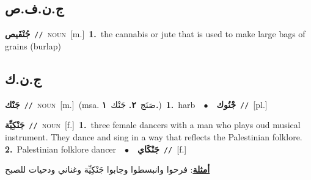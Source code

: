 \documentclass[10pt,a4paper,twoside]{article} %
\begin{document}
\begin{multicols}{2}
\vspace{-3mm}
\subsection*{\color{blue}\foreignlanguage{arabic}{ج.ن.ف.ص}\color{blue}{}} 

{\setlength\topsep{0pt}\textbf{\foreignlanguage{arabic}{جُنْفَيص}}\ {\color{gray}\texttt{//}\color{black}}\ \textsc{noun}\ [m.]\ \textbf{1.}~the cannabis or jute that is used to make large bags of grains (burlap)\ } \vspace{2mm}

\vspace{-3mm}
\subsection*{\color{blue}\foreignlanguage{arabic}{ج.ن.ك}\color{blue}{}} 

{\setlength\topsep{0pt}\textbf{\foreignlanguage{arabic}{جَنْك}}\ {\color{gray}\texttt{//}\color{black}}\ \textsc{noun}\ [m.]\ \color{gray}(msa. \foreignlanguage{arabic}{صَنَج}~\foreignlanguage{arabic}{\textbf{٢.}}  \foreignlanguage{arabic}{جَنْك}~\foreignlanguage{arabic}{\textbf{١.}})\color{black}\ \textbf{1.}~harb\ \ $\bullet$\ \ \setlength\topsep{0pt}\textbf{\foreignlanguage{arabic}{جْنُوك}}\ {\color{gray}\texttt{//}\color{black}}\ [pl.]\ } \vspace{2mm}

{\setlength\topsep{0pt}\textbf{\foreignlanguage{arabic}{جَنْكِيِّة}}\ {\color{gray}\texttt{//}\color{black}}\ \textsc{noun}\ [f.]\ \textbf{1.}~three female dancers with a man who plays oud musical instrument. They dance and sing in a way that reflects the Palestinian folklore.  \textbf{2.}~Palestinian folklore dancer\ \ $\bullet$\ \ \setlength\topsep{0pt}\textbf{\foreignlanguage{arabic}{جَنْكَاي}}\ {\color{gray}\texttt{//}\color{black}}\ [f.]\  \begin{flushright}\color{gray}\foreignlanguage{arabic}{\textbf{\underline{\foreignlanguage{arabic}{أمثلة}}}: فرحوا وانبسطوا وجابوا جَنْكِيِّة وغناني ودحيات للصبح}\end{flushright}\color{black}} \vspace{2mm}


\end{multicols}
\end{document}
